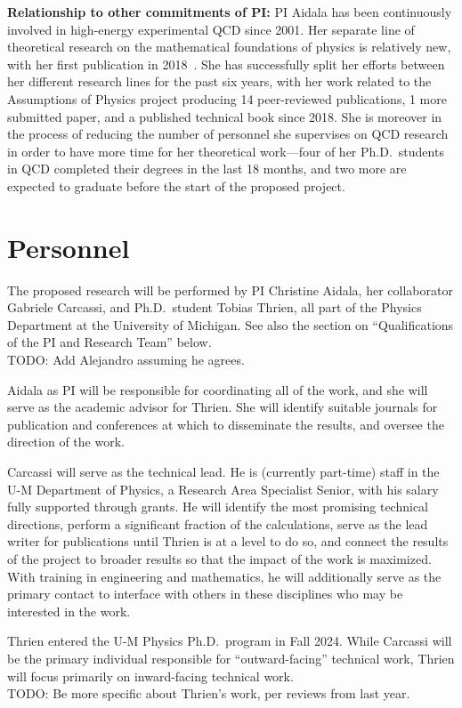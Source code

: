 \noindent
\textbf{Relationship to other commitments of PI:} PI Aidala has been continuously involved in high-energy experimental QCD since 2001.  Her separate line of theoretical research on the mathematical foundations of physics is relatively new, with her first publication in 2018~\cite{aop-phys-blueprint}. She has successfully split her efforts between her different research lines for the past six years, with her work related to the Assumptions of Physics project producing 14 peer-reviewed publications, 1 more submitted paper, and a published technical book since 2018.  She is moreover in the process of reducing the number of personnel she supervises on QCD research in order to have more time for her theoretical work---four of her Ph.D.~students in QCD completed their degrees in the last 18 months, and two more are expected to graduate before the start of the proposed project.  




\section{Personnel}
The proposed research will be performed by PI Christine Aidala, her collaborator Gabriele Carcassi, and Ph.D.~student Tobias Thrien, all part of the Physics Department at the University of Michigan.  See also the section on ``Qualifications of the PI and Research Team'' below.  \\
TODO: Add Alejandro assuming he agrees.

Aidala as PI will be responsible for coordinating all of the work, and she will serve as the academic advisor for Thrien.  She will identify suitable journals for publication and conferences at which to disseminate the results, and oversee the direction of the work.  

Carcassi will serve as the technical lead.  He is (currently part-time) staff in the U-M Department of Physics, a Research Area Specialist Senior, with his salary fully supported through grants.  He will identify the most promising technical directions, perform a significant fraction of the calculations, serve as the lead writer for publications until Thrien is at a level to do so, and connect the results of the project to broader results so that the impact of the work is maximized.  With training in engineering and mathematics, he will additionally serve as the primary contact to interface with others in these disciplines who may be interested in the work.

Thrien entered the U-M Physics Ph.D.~program in Fall 2024.  While Carcassi will be the primary individual responsible for ``outward-facing'' technical work, Thrien will focus primarily on inward-facing technical work.  \\
TODO: Be more specific about Thrien's work, per reviews from last year.



